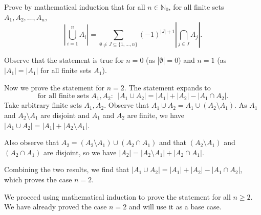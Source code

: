 \documentclass[answers]{exercises}
\newcommand{\N}{\mathbb{N}}
\begin{document}
\begin{questions}
	\question
	Prove by mathematical induction that for all $n\in\N_0$, for all finite sets $A_1,A_2,\dots,A_n$, \[\left|\bigcup_{i=1}^n A_i\right| = \sum_{\emptyset\neq J\subseteq\{1,\dots,n\}}(-1)^{|J|+1}\left|\bigcap_{j\in J}A_j\right|.\]

	\begin{solution}
		Observe that the statement is true for $n=0$ (as $|\emptyset|=0$) and $n=1$ (as $|A_1|=|A_1|$ for all finite sets $A_1$).

		Now we prove the statement for $n=2$. The statement expands to \[\text{for all finite sets $A_1, A_2$:}~~~|A_1\cup A_2|=|A_1|+|A_2|-|A_1\cap A_2|.\]
		Take arbitrary finite sets $A_1, A_2$. Observe that $A_1\cup A_2=A_1\cup(A_2\setminus A_1)$. As $A_1$ and $A_2\setminus A_1$ are disjoint and $A_1$ and $A_2$ are finite, we have $|A_1\cup A_2| = |A_1|+|A_2\setminus A_1|$.

		Also observe that $A_2=(A_2\setminus A_1)\cup(A_2\cap A_1)$ and that $(A_2\setminus A_1)$ and $(A_2\cap A_1)$ are disjoint, so we have $|A_2|=|A_2\setminus A_1|+|A_2\cap A_1|$.

		Combining the two results, we find that $|A_1\cup A_2|=|A_1|+|A_2|-|A_1\cap A_2|$, which proves the case $n=2$.

		We proceed using mathematical induction to prove the statement for all $n\geq2$. We have already proved the case $n=2$ and will use it as a base case.


\end{solution}
\end{questions}
\end{document}
